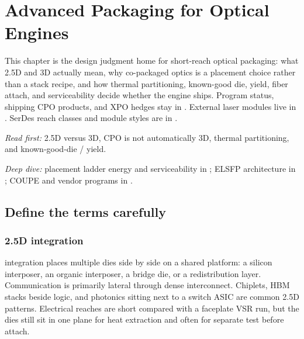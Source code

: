 \chapter{Advanced Packaging for Optical Engines}
\label{ch:packaging}
\label{sec:advanced-packaging}

This chapter is the design judgment home for short-reach optical packaging:
what 2.5D and 3D actually mean, why co-packaged optics is a placement choice
rather than a stack recipe, and how thermal partitioning, known-good die,
yield, fiber attach, and serviceability decide whether the engine ships.
Program status, shipping CPO products, and XPO hedges stay in
. External laser modules
live in . SerDes reach classes and module styles are in
.

\textit{Read first:} 2.5D versus 3D, CPO is not automatically 3D, thermal
partitioning, and known-good-die / yield.

\textit{Deep dive:} placement ladder energy and serviceability in
; ELSFP architecture in ; COUPE and
vendor programs in .


\section{Define the terms carefully}
\label{sec:pkg-terms}

\subsection{2.5D integration}
\label{sec:pkg-25d}

 integration places multiple dies side by side
on a shared platform: a silicon interposer, an organic interposer, a bridge
die, or a redistribution layer. Communication is primarily lateral through
dense interconnect. Chiplets, HBM stacks beside logic, and photonics sitting
next to a switch ASIC are common 2.5D patterns. Electrical reaches are short
compared with a faceplate VSR run, but the dies still sit in one plane for
heat extraction and often for separate test before attach.

